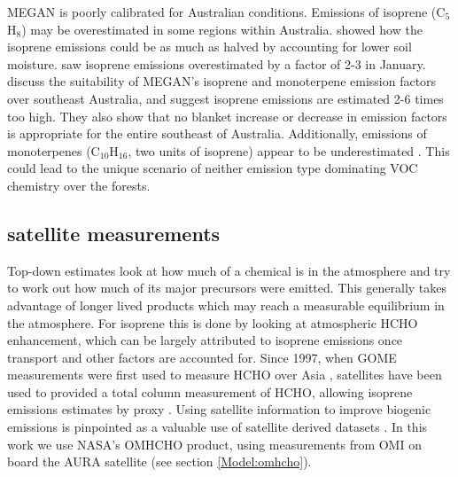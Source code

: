     MEGAN is poorly calibrated for Australian conditions.
    Emissions of isoprene (C$_5$H$_8$) may be overestimated in some regions within Australia.
    \textcite{Sindelarova2014} showed how the isoprene emissions could be as much as halved by accounting for lower soil moisture.
    \textcite{Stavrakou2015} saw isoprene emissions overestimated by a factor of 2-3 in January.
    \textcite{Emmerson2016} discuss the suitability of MEGAN's isoprene and monoterpene emission factors over southeast Australia, and suggest isoprene emissions are estimated 2-6 times too high.
    They also show that no blanket increase or decrease in emission factors is appropriate for the entire southeast of Australia.
    Additionally, emissions of monoterpenes (C$_{10}$H$_{16}$, two units of isoprene) appear to be underestimated \parencite{Emmerson2016}.
    This could lead to the unique scenario of neither emission type dominating VOC chemistry over the forests.
  
  
  \subsection{satellite measurements}
    \label{BioIsop:intro:satellite_inversion}
    Top-down estimates look at how much of a chemical is in the atmosphere and try to work out how much of its major precursors were emitted.
    This generally takes advantage of longer lived products which may reach a measurable equilibrium in the atmosphere.
    For isoprene this is done by looking at atmospheric HCHO enhancement, which can be largely attributed to isoprene emissions once transport and other factors are accounted for.
    Since 1997, when GOME measurements were first used to measure HCHO over Asia \parencite{Thomas1998}, satellites have been used to provided a total column measurement of HCHO, allowing isoprene emissions estimates by proxy \parencite{Palmer2001,Bauwens2016}.
    Using satellite information to improve biogenic emissions is pinpointed as a valuable use of satellite derived datasets \parencite{Streets2013}.
    In this work we use NASA's OMHCHO product, using measurements from OMI on board the AURA satellite (see section \ref{Model:omhcho}).
    
